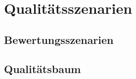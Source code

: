 \chapter{Qualitätsszenarien}
\label{sec:qualityscenarios}

\section{Bewertungsszenarien}

\section{Qualitätsbaum}
